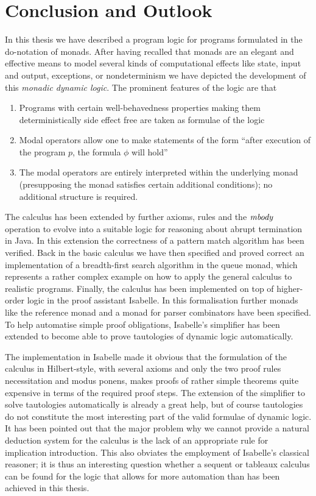 
\chapter{Conclusion and Outlook}
\label{cha:outlook}


In this thesis we have described a program logic for programs formulated in the
do-notation of monads. After having recalled that monads are an elegant and
effective means to model several kinds of computational effects like state,
input and output, exceptions, or nondeterminism we have depicted the
development of this \emph{monadic dynamic logic}. The prominent features of the
logic are that
\begin{enumerate}
  \item Programs with certain well-behavedness properties making them
    deterministically side effect free are taken as formulae
    of the logic
  \item Modal operators allow one to make statements of the form ``after
    execution of the program $p$, the formula $\phi$ will hold''
  \item The modal operators are entirely interpreted within the underlying monad
    (presupposing the monad satisfies certain additional conditions); no
    additional structure is required.
\end{enumerate}
The calculus has been extended by further axioms, rules and the $\mathit{mbody}$
operation to evolve into a suitable logic for reasoning about abrupt termination
in Java. In this extension the correctness of a pattern match algorithm has been
verified. Back in the basic calculus we have then specified and proved correct an
implementation of a breadth-first search algorithm in the queue monad, which
represents a rather complex example on how to apply the general calculus to
realistic programs.  Finally, the calculus has been implemented on top of
higher-order logic in the proof assistant Isabelle.  In this formalisation
further monads like the reference monad and a monad for parser combinators have
been specified. To help automatise simple proof obligations, Isabelle's
simplifier has been extended to become able to prove tautologies of dynamic
logic automatically.


The implementation in Isabelle made it obvious that the formulation of the
calculus in Hilbert-style, \IE with several axioms and only the two proof rules
necessitation and modus ponens, makes proofs of rather simple theorems quite
expensive in terms of the required proof steps. The extension of the simplifier
to solve tautologies automatically is already a great help, but of course
tautologies do not constitute the most interesting part of the valid formulae of
dynamic logic. It has been pointed out that the major problem why we cannot
provide a natural deduction system for the calculus is the lack of an
appropriate rule for implication introduction. This also obviates the employment
of Isabelle's classical reasoner; it is thus an interesting question whether a
sequent or tableaux calculus can be found for the logic that allows for more
automation than has been achieved in this thesis.

